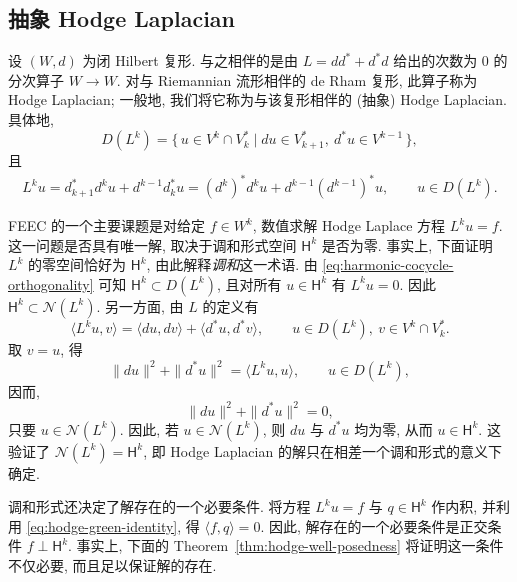 \subsection{{抽象 Hodge Laplacian}}\label{sec:abstract-hodge-laplacian}

{设 $(W,d)$ 为闭 Hilbert 复形. 与之相伴的是由 $L=dd^*+d^*d$ 给出的次数为 $0$ 的分次算子 $W\to W$. 对与 Riemannian 流形相伴的 de Rham 复形, 此算子称为 Hodge Laplacian; 一般地, 我们将它称为与该复形相伴的 (抽象) Hodge Laplacian. 具体地,}
\begin{equation}\label{eq:abstract-hodge-domain}
D(L^k)=\{\,u\in V^k\cap V_k^*\mid du\in V_{k+1}^*,\ d^*u\in V^{k-1}\,\},
\end{equation}
{且}
\begin{equation}\label{eq:abstract-hodge-operator}
\begin{gathered}
L^k u=d_{k+1}^*d^k u+d^{k-1}d_k^*u=(d^k)^*d^k u+d^{k-1}(d^{k-1})^*u,\qquad u\in D(L^k).
\end{gathered}
\end{equation}

{FEEC 的一个主要课题是对给定 $f\in W^k$, 数值求解 Hodge Laplace 方程 $L^k u=f$. 这一问题是否具有唯一解, 取决于调和形式空间 $\mathsf H^k$ 是否为零. 事实上, 下面证明 $L^k$ 的零空间恰好为 $\mathsf H^k$, 由此解释\emph{调和}这一术语. 由 \eqref{eq:harmonic-cocycle-orthogonality} 可知 $\mathsf H^k\subset D(L^k)$, 且对所有 $u\in\mathsf H^k$ 有 $L^k u=0$. 因此 $\mathsf H^k\subset\mathcal N(L^k)$. 另一方面, 由 $L$ 的定义有}
\begin{equation}\label{eq:hodge-green-identity}
\langle L^k u,v\rangle=\langle du,dv\rangle+\langle d^*u,d^*v\rangle,\qquad u\in D(L^k),\ v\in V^k\cap V_k^*.
\end{equation}
{取 $v=u$, 得}
\[
\|du\|^2+\|d^*u\|^2=\langle L^k u,u\rangle,\qquad u\in D(L^k),
\]
{因而,}
\[
\|du\|^2+\|d^*u\|^2=0,
\]
{只要 $u\in\mathcal N(L^k)$. 因此, 若 $u\in\mathcal N(L^k)$, 则 $du$ 与 $d^*u$ 均为零, 从而 $u\in\mathsf H^k$. 这验证了 $\mathcal N(L^k)=\mathsf H^k$, 即 Hodge Laplacian 的解只在相差一个调和形式的意义下确定.}

{调和形式还决定了解存在的一个必要条件. 将方程 $L^k u=f$ 与 $q\in\mathsf H^k$ 作内积, 并利用 \eqref{eq:hodge-green-identity}, 得 $\langle f,q\rangle=0$. 因此, 解存在的一个必要条件是正交条件 $f\perp\mathsf H^k$. 事实上, 下面的 Theorem~\ref{thm:hodge-well-posedness} 将证明这一条件不仅必要, 而且足以保证解的存在.}

